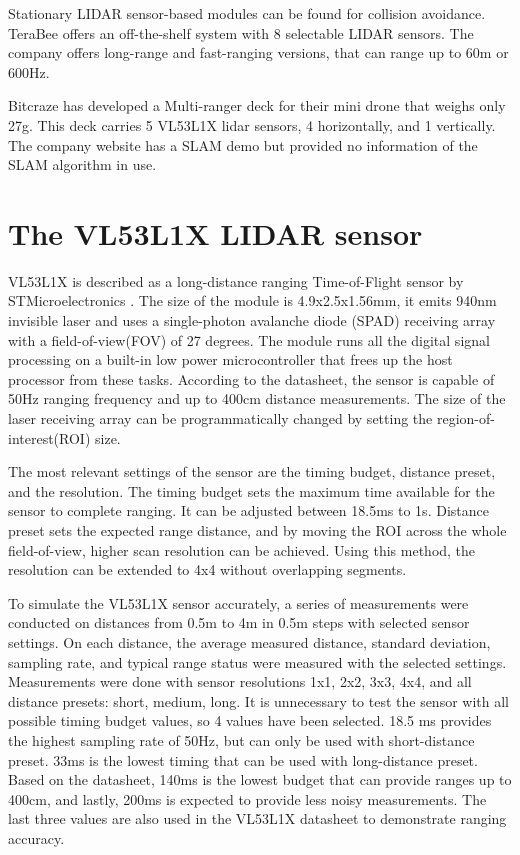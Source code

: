 \documentclass[conference]{IEEEtran}
\begin{document}
Stationary LIDAR sensor-based modules can be found for collision avoidance. TeraBee offers an off-the-shelf 
system with 8 selectable LIDAR sensors. The company offers long-range and fast-ranging versions, that can range
up to 60m or 600Hz.

Bitcraze has developed a Multi-ranger deck for their mini drone that weighs only 27g. This deck carries 5 VL53L1X
lidar sensors, 4 horizontally, and 1 vertically. The company website has a SLAM demo but provided no information
of the SLAM algorithm in use. 

\section{The VL53L1X LIDAR sensor}

VL53L1X is described as a long-distance ranging Time-of-Flight sensor by STMicroelectronics \cite{VL53L1XDatasheet}. 
The size of the module is 4.9x2.5x1.56mm, it emits 940nm invisible laser and uses a single-photon avalanche diode 
(SPAD) receiving array with a field-of-view(FOV) of 27 degrees. The module runs all the digital signal processing on a 
built-in low power microcontroller that frees up the host processor from these tasks. According to the datasheet, 
the sensor is capable of 50Hz ranging frequency and up to 400cm distance measurements. The size of the laser 
receiving array can be programmatically changed by setting the region-of-interest(ROI) size. 



The most relevant settings of the sensor are the timing budget, distance preset, and the resolution.
The timing budget sets the maximum time available for the sensor to complete ranging. It can be adjusted 
between 18.5ms to 1s. Distance preset sets 
the expected range distance, and by moving the ROI across the whole field-of-view, higher scan resolution 
can be achieved. Using this method, the resolution can be extended to 4x4 without overlapping segments.

To simulate the VL53L1X sensor accurately, a series of measurements were conducted on distances from 0.5m to 4m
in 0.5m steps with selected sensor settings. On each distance, the average measured distance, standard deviation,
sampling rate, and typical range status were measured with the selected settings. Measurements were done with 
sensor resolutions 1x1, 2x2, 3x3, 4x4, and all distance presets: short, medium, long. It is unnecessary to test
the sensor with all possible timing budget values, so 4 values have been selected.
18.5 ms provides the highest sampling rate of 50Hz, but can only be used with short-distance preset. 33ms is the 
lowest timing that can be used with long-distance preset. Based on the datasheet, 140ms is the lowest budget that
can provide ranges up to 400cm, and lastly, 200ms is expected to provide less noisy measurements.
The last three values are also used in the VL53L1X datasheet\cite{VL53L1XDatasheet} to demonstrate ranging 
accuracy. 
\end{document}
